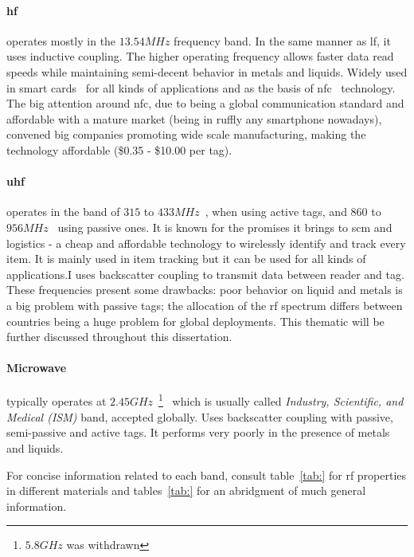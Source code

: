 \paragraph*{\ac{hf}} operates mostly in the $13.54MHz$ frequency band. In the same manner as \ac{lf}, it uses inductive coupling. The higher operating frequency allows faster data read speeds while maintaining semi-decent behavior in metals and liquids.
Widely used in smart cards~\cite{isoISOIEC156932, MIFARE} for all kinds of applications and as the basis of \ac{nfc}~\cite{isoISOIEC144434, isoISOIEC180003} technology. The big attention around \ac{nfc}, due to being a global communication standard and affordable with a mature market (being in ruffly any smartphone nowadays), convened big companies promoting wide scale manufacturing, making the technology affordable (\$0.35 - \$10.00 per tag).

\paragraph*{\ac{uhf}} operates in the band of $315$ to $433MHz$~\cite{isoISOIEC180007}, when using active tags, and $860$ to $956MHz$~\cite{isoISOIEC180006} using passive ones. It is known for the promises it brings to \ac{scm} and logistics - a cheap and affordable technology to wirelessly identify and track every item. It is mainly used in item tracking but it can be used for all kinds of applications.I uses backscatter coupling to transmit data between reader and tag. These frequencies present some drawbacks: poor behavior on liquid and metals is a big problem with passive tags; the allocation of the \ac{rf} spectrum differs between countries being a huge problem for global deployments. This thematic will be further discussed throughout this dissertation.

\paragraph*{Microwave} typically operates at $2.45GHz$~\footnote{$5.8GHz$ was withdrawn}~\cite{isoISOIEC180004} which is usually called \emph{Industry, Scientific, and Medical (ISM)} band, accepted globally. Uses backscatter coupling with passive, semi-passive and active tags. It performs very poorly in the presence of metals and liquids. 

For concise information related to each band, consult table~\ref{tab:} for \ac{rf} properties in different materials and tables~\ref{tab:} for an abridgment of much general information.

